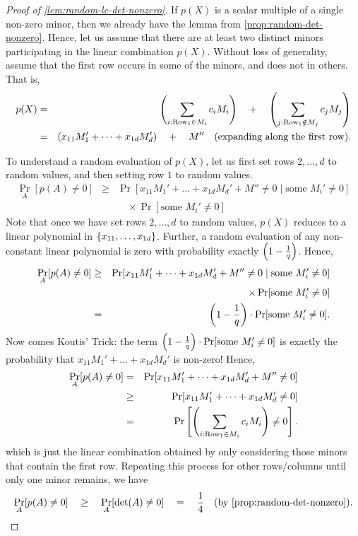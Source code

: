 \begin{proof}[Proof of \autoref{lem:random-lc-det-nonzero}]
  If $p(X)$ is a scalar multiple of a single non-zero minor, then we
  already have the lemma from
  \autoref{prop:random-det-nonzero}. 
Hence, let us assume that
  there are at least two distinct minors participating in the linear
  combination $p(X)$. 
Without loss of generality, assume that the
  first row occurs in some of the minors, and does not in others. 
That is, 
  \begin{eqnarray*}
    p(X) &=& \left(\sum_{i:\text{Row}_1\in M_i} c_i M_i\right) \quad+ \quad \left(\sum_{j:\text{Row}_1\notin M_j} c_j M_j\right)\\
     & = & \left(x_{11} M_1' + \dots + x_{1d} M_{d}'\right) \quad+\quad M'' \quad\text{(expanding along the first row)}.
  \end{eqnarray*}
  
  To understand a random evaluation of $p(X)$, let us first set rows
  $2, \dots, d$ to random values, and then setting row $1$ to random
  values.
  \begin{eqnarray*}
    \Pr_{A}[p(A)\neq 0] & \geq & \Pr[x_{11} M_1' + \dots + x_{1d} M_d' + M'' \neq 0 \;|\; \text{some }M_{i}'\neq 0]\\
    & & \quad \times \Pr[\text{some }M_i' \neq 0]
  \end{eqnarray*}
  Note that once we have set rows $2,\dots, d$ to random values,
  $p(X)$ reduces to a linear polynomial in $\left\{x_{11},\dots,
    x_{1d}\right\}$. 
Further, a random evaluation of any non-constant linear
  polynomial is zero with probability exactly $\left(1
    -\frac{1}{q}\right)$. 
Hence,
  \begin{eqnarray*}
\Pr_{A}[p(A)\neq 0] & \geq & \Pr[x_{11} M_1' + \dots + x_{1d} M_d' + M'' \neq 0 \;|\; \text{some }M_{i}'\neq 0]\\
 & & \quad \times \Pr[\text{some }M_i' \neq 0]\\
    & = & \left(1 - \frac{1}{q}\right)\cdot \Pr[\text{some }M_i' \neq 0].
  \end{eqnarray*}
  Now comes  Koutis' Trick: the term $\left(1 -
    \frac{1}{q}\right) \cdot \Pr[\text{some }M_i' \neq 0]$ is exactly the
  probability that $x_{11}M_1' + \dots + x_{1d}M_d'$ is non-zero! 
Hence,
\begin{eqnarray*}
\Pr_{A}[p(A) \neq 0] & = & \Pr[ x_{11}M_1' + \dots + x_{1d} M_d' + M''\neq 0]\\
 & \geq & \Pr[ x_{11}M_1' + \dots + x_{1d} M_d'\neq 0]\\
 & = & \Pr\left[\left(\sum_{i:\text{Row}_1\in M_i} c_i M_i\right) \neq 0\right].
\end{eqnarray*}
which is just the linear combination obtained by only considering
those minors that contain the first row. 
Repeating this process for other
rows/columns until only  one minor remains, we have
$$
\Pr_{A}[p(A) \neq 0] \quad \geq \quad \Pr_{A}[\det(A) \neq 0] \quad = \quad
\frac{1}{4}\quad(\text{by \autoref{prop:random-det-nonzero}}).\qedhere
$$
\end{proof}


